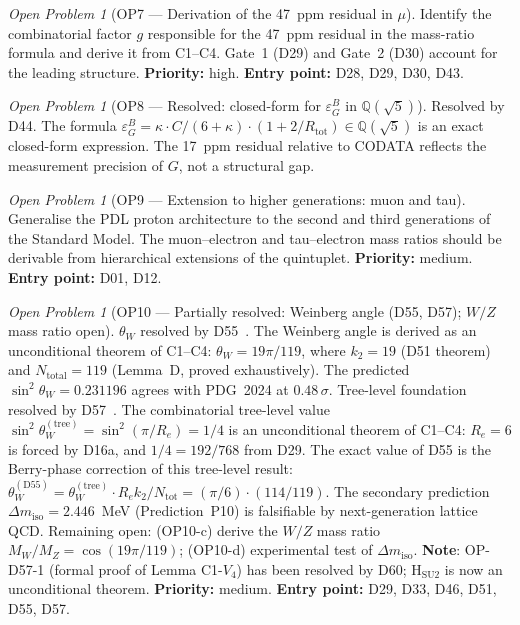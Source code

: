 \documentclass[11pt,a4paper]{article}
\theoremstyle{plain}
\theoremstyle{definition}
\theoremstyle{remark}
\newtheorem{openproblem}[theorem]{Open Problem}
\newcommand{\Rtot}{R_{\mathrm{tot}}}
\newcommand{\epsGeomB}{\varepsilon_G^B}
\begin{document}
\begin{openproblem}[OP7 --- Derivation of the 47~ppm residual in $\mu$]
\label{op:residual}
Identify the combinatorial factor $g$ responsible for the 47~ppm residual in the mass-ratio formula and derive it from C1--C4. Gate~1 (D29) and Gate~2 (D30) account for the leading structure. \textbf{Priority:} high. \textbf{Entry point:} D28, D29, D30, D43.
\end{openproblem}

\begin{openproblem}[OP8 --- Resolved: closed-form for $\epsGeomB$ in $\mathbb{Q}(\sqrt{5})$]
\label{op:epsGeomB}
\textcolor{proofblue}{Resolved by D44.} The formula $\epsGeomB = \kappa \cdot C/(6+\kappa)\cdot(1+2/\Rtot) \in \mathbb{Q}(\sqrt{5})$ is an exact closed-form expression. The 17~ppm residual relative to CODATA reflects the measurement precision of $G$, not a structural gap.
\end{openproblem}

\begin{openproblem}[OP9 --- Extension to higher generations: muon and tau]
\label{op:generations}
Generalise the PDL proton architecture to the second and third generations of the Standard Model. The muon--electron and tau--electron mass ratios should be derivable from hierarchical extensions of the quintuplet. \textbf{Priority:} medium. \textbf{Entry point:} D01, D12.
\end{openproblem}

\begin{openproblem}[OP10 --- Partially resolved: Weinberg angle (D55, D57); $W/Z$ mass ratio open]
\label{op:weak}
\textcolor{proofblue}{$\theta_W$ resolved by D55~\cite{D55}.} The Weinberg angle is derived as an unconditional theorem of C1--C4: $\theta_W = 19\pi/119$, where $k_2 = 19$ (D51 theorem) and $N_{\mathrm{total}} = 119$ (Lemma~D, proved exhaustively). The predicted $\sin^2\theta_W = 0.231196$ agrees with PDG~2024 at $0.48\,\sigma$. \textcolor{proofblue}{Tree-level foundation resolved by D57~\cite{D57}.} The combinatorial tree-level value $\sin^2\theta_W^{(\mathrm{tree})} = \sin^2(\pi/R_e) = 1/4$ is an unconditional theorem of C1--C4: $R_e = 6$ is forced by D16a, and $1/4 = 192/768$ from D29. The exact value of D55 is the Berry-phase correction of this tree-level result: $\theta_W^{(\mathrm{D55})} = \theta_W^{(\mathrm{tree})} \cdot R_e k_2/N_{\mathrm{tot}} = (\pi/6)\cdot(114/119)$. The secondary prediction $\Delta m_{\mathrm{iso}} = 2.446$~MeV (Prediction~P10) is falsifiable by next-generation lattice QCD. Remaining open: (OP10-c) derive the $W/Z$ mass ratio $M_W/M_Z = \cos(19\pi/119)$; (OP10-d) experimental test of $\Delta m_{\mathrm{iso}}$. \textbf{Note}: OP-D57-1 (formal proof of Lemma C1-$V_4$) has been resolved by D60; H$_{\mathrm{SU2}}$ is now an unconditional theorem. \textbf{Priority:} medium. \textbf{Entry point:} D29, D33, D46, D51, D55, D57.
\end{openproblem}
\end{document}
